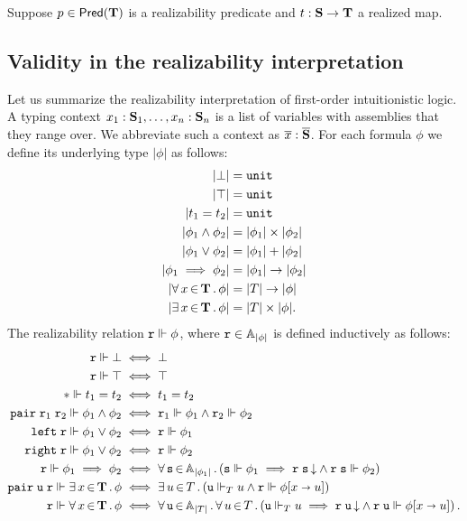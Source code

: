  Suppose $p
\in \mathsf{Pred}(\mathbf{T})$ is a realizability predicate and $t : \mathbf{S} \to
\mathbf{T}$ a realized map. 




\subsection{Validity in the realizability interpretation}
\label{sec:realizability-validity}

Let us summarize the realizability interpretation of first-order
intuitionistic logic. A typing context $x_1 : \mathbf{S}_1, \ldots, x_n :
\mathbf{S}_n$ is a list of variables with assemblies that they range
over. We abbreviate such a context as $\overline{x} :
\overline{\mathbf{S}}$. For each formula $\phi$ we define its underlying
type $|\phi|$ as follows:
%
\begin{align*}
  |\bot| &= \mathtt{unit} \\
  |\top| &= \mathtt{unit} \\
  |t_1 = t_2| &= \mathtt{unit} \\
  |\phi_1 \land \phi_2| &= |\phi_1| \times |\phi_2|\\
  |\phi_1 \lor \phi_2| &= |\phi_1| + |\phi_2|\\
  |\phi_1 \implies \phi_2| &= |\phi_1| \to |\phi_2|\\
  |\forall\, x \,{\in}\, \mathbf{T}\,.\,\phi| &= |T| \to |\phi| \\
  |\exists\, x \,{\in}\, \mathbf{T}\,.\,\phi| &= |T| \times |\phi|.
\end{align*}
%
The realizability relation $\mathtt{r} \Vdash \phi$, where $\mathtt{r} \in
\mathbb{A}_{|\phi|}$ is defined inductively as follows:
%
\begin{align*}
  \mathtt{r} \Vdash \bot &\iff \bot\\
  \mathtt{r} \Vdash \top &\iff \top\\
  {*} \Vdash t_1 = t_2 &\iff t_1 = t_2\\
  \mathtt{pair}\;\mathtt{r}_1\;\mathtt{r}_2 \Vdash \phi_1 \land \phi_2 &\iff
  \mathtt{r}_1 \Vdash \phi_1 \land \mathtt{r}_2 \Vdash \phi_2\\
  \mathtt{left}\;\mathtt{r} \Vdash \phi_1 \lor \phi_2 &\iff \mathtt{r} \Vdash \phi_1\\
  \mathtt{right}\;\mathtt{r} \Vdash \phi_1 \lor \phi_2 &\iff \mathtt{r} \Vdash \phi_2\\
  \mathtt{r} \Vdash \phi_1 \implies \phi_2 &\iff
  \forall\, \mathtt{s} \,{\in}\, \mathbb{A}_{|\phi_1|}\,.\left(\mathtt{s} \Vdash \phi_1 \implies
    \mathtt{r}\;\mathtt{s}\,{\downarrow} \land \mathtt{r}\;\mathtt{s} \Vdash \phi_2
  \right)\\
  \mathtt{pair}\;\mathtt{u}\;\mathtt{r} \Vdash \exists\, x \,{\in}\, \mathbf{T}\,.\,\phi &\iff
  \exists\, u \,{\in}\, T\,.\left(\mathtt{u} \Vdash_T u \land \mathtt{r} \Vdash \phi[x \shortrightarrow u]\right)
  \\
  \mathtt{r} \Vdash \forall\, x \,{\in}\, \mathbf{T}\,.\,\phi &\iff
  \forall\, \mathtt{u} \,{\in}\, \mathbb{A}_{|T|}\,.\,
    \forall\, u \,{\in}\, T\,.\left(
      \mathtt{u} \Vdash_T u \implies
      \mathtt{r}\;\mathtt{u}\,{\downarrow} \land \mathtt{r}\;\mathtt{u} \Vdash \phi[x \shortrightarrow u]
    \right).
\end{align*}


